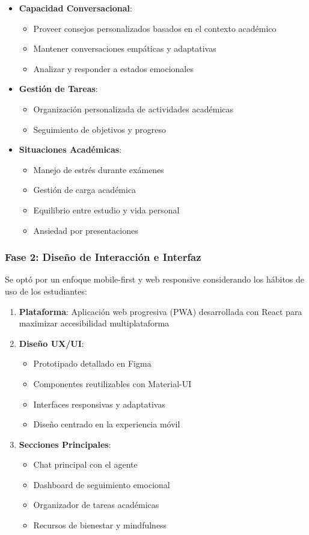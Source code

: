 \documentclass[conference]{IEEEtran}
\begin{document}
\begin{itemize}
\item \textbf{Capacidad Conversacional}:
    \begin{itemize}
    \item Proveer consejos personalizados basados en el contexto académico
    \item Mantener conversaciones empáticas y adaptativas
    \item Analizar y responder a estados emocionales
    \end{itemize}
\item \textbf{Gestión de Tareas}:
    \begin{itemize}
    \item Organización personalizada de actividades académicas
    \item Seguimiento de objetivos y progreso
    \end{itemize}
\item \textbf{Situaciones Académicas}:
    \begin{itemize}
    \item Manejo de estrés durante exámenes
    \item Gestión de carga académica
    \item Equilibrio entre estudio y vida personal
    \item Ansiedad por presentaciones
    \end{itemize}
\end{itemize}

\subsubsection{Fase 2: Diseño de Interacción e Interfaz}
Se optó por un enfoque mobile-first y web responsive considerando los hábitos de uso de los estudiantes:

\begin{enumerate}
\item \textbf{Plataforma}: Aplicación web progresiva (PWA) desarrollada con React para maximizar accesibilidad multiplataforma
\item \textbf{Diseño UX/UI}:
    \begin{itemize}
    \item Prototipado detallado en Figma
    \item Componentes reutilizables con Material-UI
    \item Interfaces responsivas y adaptativas
    \item Diseño centrado en la experiencia móvil
    \end{itemize}
\item \textbf{Secciones Principales}:
    \begin{itemize}
    \item Chat principal con el agente
    \item Dashboard de seguimiento emocional
    \item Organizador de tareas académicas
    \item Recursos de bienestar y mindfulness
    \end{itemize}
\end{enumerate}
\end{document}
